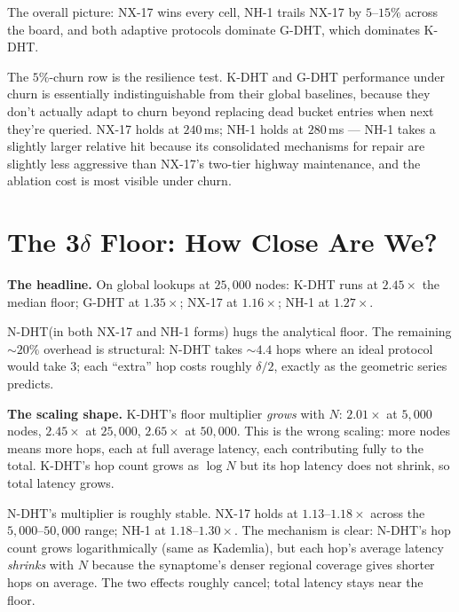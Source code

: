 \documentclass[twoside,nobib]{tufte-book}
\newcommand{\NDHT}{N-DHT\xspace}
\newcommand{\KDHT}{K-DHT\xspace}
\newcommand{\GDHT}{G-DHT\xspace}
\begin{document}
The overall picture: NX-17 wins every cell, NH-1 trails NX-17 by
$5$--$15\%$ across the board, and both adaptive protocols
dominate \GDHT, which dominates \KDHT.

The $5\%$-churn row is the resilience test. \KDHT and \GDHT
performance under churn is essentially indistinguishable from
their global baselines, because they don't actually adapt to
churn beyond replacing dead bucket entries when next they're
queried. NX-17 holds at $240$\,ms; NH-1 holds at $280$\,ms ---
NH-1 takes a slightly larger relative hit because its
consolidated mechanisms for repair are slightly less aggressive
than NX-17's two-tier highway maintenance, and the ablation
cost is most visible under churn.

\section{The 3\boldmath$\delta$ Floor: How Close Are We?}

\textbf{The headline.} On global lookups at $25{,}000$ nodes:
\KDHT runs at $2.45\times$ the median floor; \GDHT at
$1.35\times$; NX-17 at $\mathbf{1.16\times}$; NH-1 at
$\mathbf{1.27\times}$.

\NDHT (in both NX-17 and NH-1 forms) hugs the analytical floor.
The remaining $\sim 20\%$ overhead is structural: \NDHT takes
$\sim 4.4$ hops where an ideal protocol would take $3$; each
``extra'' hop costs roughly $\delta/2$, exactly as the geometric
series predicts.

\textbf{The scaling shape.} \KDHT's floor multiplier
\emph{grows} with $N$: $2.01\times$ at $5{,}000$ nodes,
$2.45\times$ at $25{,}000$, $2.65\times$ at $50{,}000$. This
is the wrong scaling: more nodes means more hops, each at full
average latency, each contributing fully to the total. \KDHT's
hop count grows as $\log N$ but its hop latency does not
shrink, so total latency grows.

\NDHT's multiplier is roughly stable. NX-17 holds at
$1.13$--$1.18\times$ across the $5{,}000$--$50{,}000$ range;
NH-1 at $1.18$--$1.30\times$. The mechanism is clear:
\NDHT's hop count grows logarithmically (same as Kademlia), but
each hop's average latency \emph{shrinks} with $N$ because the
synaptome's denser regional coverage gives shorter hops on
average. The two effects roughly cancel; total latency stays
near the floor.
\end{document}
